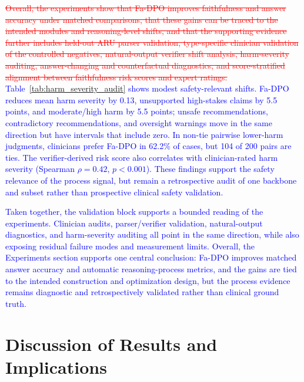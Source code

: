 \documentclass[a4paper,fleqn,doubleblind]{cas-sc}
\DeclareRobustCommand{\deleted}[1]{\textcolor{red}{\sout{#1}}}
\DeclareRobustCommand{\added}[1]{\textcolor{blue}{#1}}
\begin{document}
\deleted{Overall, the experiments show that Fa-DPO improves faithfulness and answer accuracy under matched comparisons, that these gains can be traced to the intended modules and reasoning-level shifts, and that the supporting evidence further includes held-out ARU parser validation, type-specific clinician validation of the controlled negatives, natural-output verifier shift analysis, harm-severity auditing, answer-changing and counterfactual diagnostics, and score-stratified alignment between faithfulness risk scores and expert ratings.}
\added{Table~\ref{tab:harm_severity_audit} shows modest safety-relevant shifts. Fa-DPO reduces mean harm severity by 0.13, unsupported high-stakes claims by 5.5 points, and moderate/high harm by 5.5 points; unsafe recommendations, contradictory recommendations, and oversight warnings move in the same direction but have intervals that include zero. In non-tie pairwise lower-harm judgments, clinicians prefer Fa-DPO in 62.2\% of cases, but 104 of 200 pairs are ties. The verifier-derived risk score also correlates with clinician-rated harm severity (Spearman $\rho=0.42$, $p<0.001$). These findings support the safety relevance of the process signal, but remain a retrospective audit of one backbone and subset rather than prospective clinical safety validation.}

\added{Taken together, the validation block supports a bounded reading of the experiments. Clinician audits, parser/verifier validation, natural-output diagnostics, and harm-severity auditing all point in the same direction, while also exposing residual failure modes and measurement limits. Overall, the Experiments section supports one central conclusion: Fa-DPO improves matched answer accuracy and automatic reasoning-process metrics, and the gains are tied to the intended construction and optimization design, but the process evidence remains diagnostic and retrospectively validated rather than clinical ground truth.}

\section{Discussion of Results and Implications}
\label{sec:discussion_implications}
\end{document}
